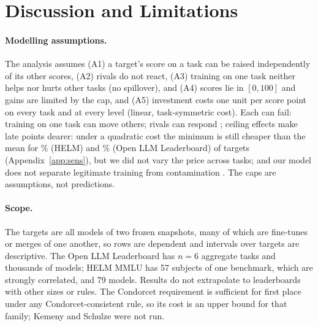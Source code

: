 \section{Discussion and Limitations}
\label{sec:limits}

\paragraph{Modelling assumptions.}
The analysis assumes (A1) a target's score on a task can be raised independently of its other scores, (A2) rivals do not react, (A3) training on one task neither helps nor hurts other tasks (no spillover), and (A4) scores lie in $[0,100]$ and gains are limited by the cap, and (A5) investment costs one unit per score point on every task and at every level (linear, task-symmetric cost). Each can fail: training on one task can move others; rivals can respond \citep{chen2026incentives}; ceiling effects make late points dearer: under a quadratic cost the minimum is still cheaper than the mean for \cvxHelmQuadraticShare\% (HELM) and \cvxOllbQuadraticShare\% (Open LLM Leaderboard) of targets (Appendix~\ref{app:sens}), but we did not vary the price across tasks; and our model does not separate legitimate training from contamination \citep{zhou2023cheater,yang2023rephrased}. The caps are assumptions, not predictions.

\paragraph{Scope.}
The targets are all models of two frozen snapshots, many of which are fine-tunes or merges of one another, so rows are dependent and intervals over targets are descriptive. The Open LLM Leaderboard has $n=6$ aggregate tasks and thousands of models; HELM MMLU has 57 subjects of one benchmark, which are strongly correlated, and 79 models. Results do not extrapolate to leaderboards with other sizes or rules. The Condorcet requirement is sufficient for first place under any Condorcet-consistent rule, so its cost is an upper bound for that family; Kemeny and Schulze were not run.

